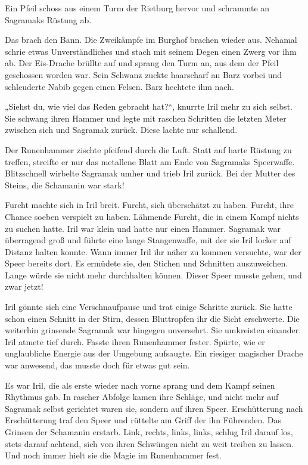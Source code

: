 Ein Pfeil schoss aus einem Turm der Rietburg hervor und schrammte an Sagramaks Rüstung ab.

Das brach den Bann. Die Zweikämpfe im Burghof brachen wieder aus. Nehamal schrie etwas Unverständliches und stach mit seinem Degen einen Zwerg vor ihm ab. Der Eis-Drache brüllte auf und sprang den Turm an, aus dem der Pfeil geschossen worden war. Sein Schwanz zuckte haarscharf an Barz vorbei und schleuderte Nabib gegen einen Felsen. Barz hechtete ihm nach.

„Siehst du, wie viel das Reden gebracht hat?“, knurrte Iril mehr zu sich selbst. Sie schwang ihren Hammer und legte mit raschen Schritten die letzten Meter zwischen sich und Sagramak zurück. Diese lachte nur schallend.

Der Runenhammer zischte pfeifend durch die Luft. Statt auf harte Rüstung zu treffen, streifte er nur das metallene Blatt am Ende von Sagramaks Speerwaffe. Blitzschnell wirbelte Sagramak umher und trieb Iril zurück. Bei der Mutter des Steins, die Schamanin war stark!

Furcht machte sich in Iril breit. Furcht, sich überschätzt zu haben. Furcht, ihre Chance soeben verspielt zu haben. Lähmende Furcht, die in einem Kampf nichts zu suchen hatte. Iril war klein und hatte nur einen Hammer. Sagramak war überragend groß und führte eine lange Stangenwaffe, mit der sie Iril locker auf Distanz halten konnte. Wann immer Iril ihr näher zu kommen versuchte, war der Speer bereits dort. Es ermüdete sie, den Stichen und Schnitten auszuweichen. Lange würde sie nicht mehr durchhalten können. Dieser Speer musste gehen, und zwar jetzt!

Iril gönnte sich eine Verschnaufpause und trat einige Schritte zurück. Sie hatte schon einen Schnitt in der Stirn, dessen Bluttropfen ihr die Sicht erschwerte. Die weiterhin grinsende Sagramak war hingegen unversehrt. Sie umkreisten einander. Iril atmete tief durch. Fasste ihren Runenhammer fester. Spürte, wie er unglaubliche Energie aus der Umgebung aufsaugte. Ein riesiger magischer Drache war anwesend, das musste doch für etwas gut sein.

Es war Iril, die als erste wieder nach vorne sprang und dem Kampf seinen Rhythmus gab. In rascher Abfolge kamen ihre Schläge, und nicht mehr auf Sagramak selbst gerichtet waren sie, sondern auf ihren Speer. Erschütterung nach Erschütterung traf den Speer und rüttelte am Griff der ihn Führenden. Das Grinsen der Schamanin erstarb. Link, rechts, links, links, schlug Iril darauf los, stets darauf achtend, sich von ihren Schwüngen nicht zu weit treiben zu lassen. Und noch immer hielt sie die Magie im Runenhammer fest.

